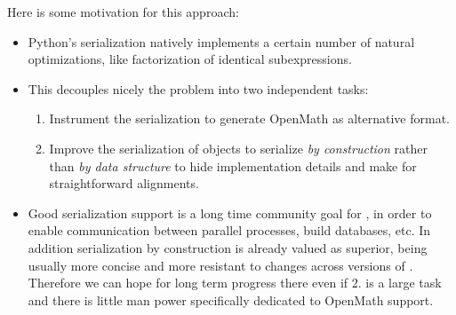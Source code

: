 Here is some motivation for this approach:
\begin{itemize}
\item Python's serialization natively implements a certain number of
  natural optimizations, like factorization of identical subexpressions.


\item This decouples nicely the problem into two independent tasks:
  \begin{enumerate}
  \item Instrument the serialization to generate OpenMath as
    alternative format.
  \item Improve the serialization of \Sage objects to serialize
    \emph{by construction} rather than \emph{by data structure} to
    hide implementation details and make for straightforward
    alignments.
  \end{enumerate}

\item Good serialization support is a long time community goal for
  \Sage, in order to enable communication between parallel processes,
  build databases, etc. In addition serialization by construction is
  already valued as superior, being usually more concise and more
  resistant to changes across versions of \Sage. Therefore we can hope
  for long term progress there even if 2. is a large task and there is
  little man power specifically dedicated to OpenMath support.


\end{itemize}



